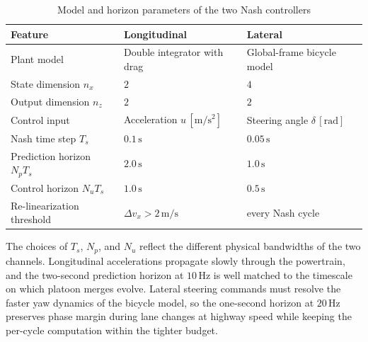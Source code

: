 \documentclass[12pt,a4paper,oneside]{report}
\begin{document}
\begin{table}[H]
\centering
\footnotesize
\setlength{\tabcolsep}{4pt}
\renewcommand{\arraystretch}{1.2}
\begin{tabularx}{\textwidth}{|l|X|X|}
\hline
\textbf{Feature} & \textbf{Longitudinal} & \textbf{Lateral} \\
\hline
Plant model                                  & Double integrator with drag                     & Global-frame bicycle model~\cite{rajamaniVehicleDynamicsControl2005} \\
State dimension $n_x$                        & $2$                                             & $4$                                    \\
Output dimension $n_z$                       & $2$                                             & $2$                                    \\
Control input                                & Acceleration $u\,[\mathrm{m/s^2}]$              & Steering angle $\delta\,[\mathrm{rad}]$ \\
Nash time step $T_s$                         & $0.1\,\mathrm{s}$                               & $0.05\,\mathrm{s}$                     \\
Prediction horizon $N_p T_s$                 & $2.0\,\mathrm{s}$                               & $1.0\,\mathrm{s}$                      \\
Control horizon $N_u T_s$                    & $1.0\,\mathrm{s}$                               & $0.5\,\mathrm{s}$                      \\
Re-linearization threshold                   & $\Delta v_x > 2\,\mathrm{m/s}$                  & every Nash cycle                       \\
\hline
\end{tabularx}
\caption{Model and horizon parameters of the two Nash controllers}
\label{tab:comparison_model}
\end{table}

The choices of $T_s$, $N_p$, and $N_u$ reflect the different physical bandwidths of the two channels. Longitudinal accelerations propagate slowly through the powertrain, and the two-second prediction horizon at $10\,\mathrm{Hz}$ is well matched to the timescale on which platoon merges evolve. Lateral steering commands must resolve the faster yaw dynamics of the bicycle model, so the one-second horizon at $20\,\mathrm{Hz}$ preserves phase margin during lane changes at highway speed while keeping the per-cycle computation within the tighter budget.
\end{document}
